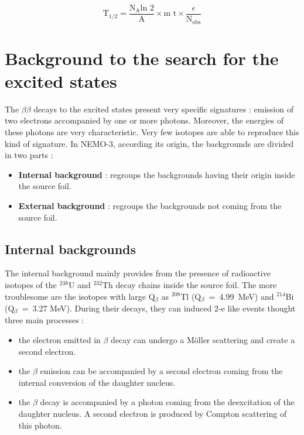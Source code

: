 \documentclass[main.tex]{subfiles}
\begin{document}
\begin{equation}
\text{T}_{\text{1/2}} = \frac{\text{N}_\text{A} \text{ln 2}}{\text{A}} \times \text{m t} \times \frac{\epsilon}{\text{N}_{\text{obs}}}
\end{equation}



\section{Background to the search for the excited states}\label{sec:BKGexcitedStates}


\NI The $\beta \beta$ decays to the excited states present very specific signatures : emission of two electrons accompanied by one or more photons. Moreover, the energies of these photons are very characteristic. Very few isotopes are able to reproduce this kind of signature. In NEMO-3, according its origin, the backgrounds are divided in two parts : 


\begin{itemize}
\item \textbf{Internal background} : regroups the backgrounds having their origin inside the source foil.
\item \textbf{External background} : regroups the backgrounds not coming from the source foil.
\end{itemize}








\subsection{Internal backgrounds}


\NI The internal background mainly provides from the presence of radioactive isotopes of the $^{\text{238}}$U and $^{\text{232}}$Th decay chains inside the source foil. The more troublesome are the isotopes with large Q$_\beta$ as $^{\text{208}}$Tl (Q$_\beta$~=~4.99~MeV) and $^{\text{214}}$Bi (Q$_{\beta}$~=~3.27 MeV). During their decays, they can induced 2-e like events thought three main processes :


\begin{itemize}
\item the electron emitted in $\beta$ decay can undergo a M\"oller scattering and create a second electron.
\item the $\beta$ emission can be accompanied by a second electron coming from the internal conversion of the daughter nucleus.
\item the $\beta$ decay is accompanied by a photon coming from the deexcitation of the daughter nucleus. A second electron is produced by Compton scattering of this photon.
\end{itemize} 
\end{document}
